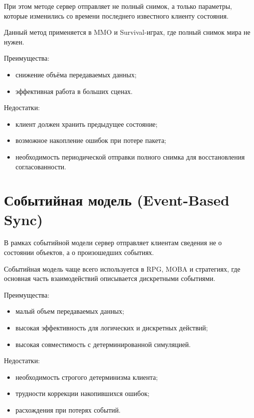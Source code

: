 При этом методе сервер отправляет не полный снимок, а только параметры, которые изменились со времени
последнего известного клиенту состояния\cite{unreal_replicate}.

Данный метод применяется в MMO и Survival-играх, где полный снимок мира не нужен.


Преимущества:

\begin{itemize}
    \item снижение объёма передаваемых данных;
    \item эффективная работа в больших сценах.
\end{itemize}

Недостатки:

\begin{itemize}
    \item клиент должен хранить предыдущее состояние;
    \item возможное накопление ошибок при потере пакета;
    \item необходимость периодической отправки полного снимка для восстановления согласованности.
\end{itemize}

\section{Событийная модель (Event-Based Sync)}

В рамках событийной модели сервер отправляет клиентам сведения не о состоянии объектов,
а о произошедших событиях\cite{GameEventSync2008}.

Событийная модель чаще всего используется в RPG, MOBA и стратегиях, где основная часть взаимодействий описывается дискретными событиями.


Преимущества:

\begin{itemize}
    \item малый объем передаваемых данных;
    \item высокая эффективность для логических и дискретных действий;
    \item высокая совместимость с детерминированной симуляцией.
\end{itemize}

Недостатки:

\begin{itemize}
    \item необходимость строгого детерминизма клиента;
    \item трудности коррекции накопившихся ошибок;
    \item расхождения при потерях событий.
\end{itemize}

